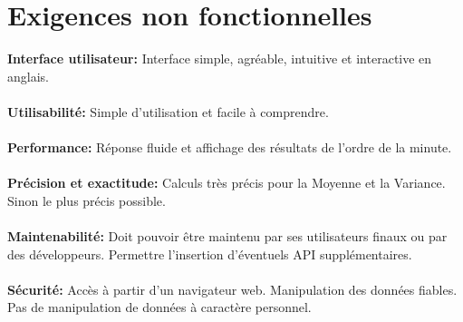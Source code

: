 	\section{Exigences non fonctionnelles}
	\begin{frame}
		\textbf{Interface utilisateur:} Interface simple, agréable, intuitive et interactive en anglais.\\~\\ 
		\pause
		\textbf{Utilisabilité:} Simple d'utilisation et facile à comprendre.\\~\\
		\pause
		\textbf{Performance:} Réponse fluide et affichage des résultats de l'ordre de la minute.\\~\\
		\pause
		\textbf{Précision et exactitude:} Calculs très précis pour la Moyenne et la Variance. Sinon le plus précis possible.\\~\\
		\pause
		\textbf{Maintenabilité:} Doit pouvoir être maintenu par ses utilisateurs finaux ou par des développeurs. Permettre l'insertion d'éventuels API supplémentaires.\\~\\
		\pause
		\textbf{Sécurité:} Accès à partir d'un navigateur web. Manipulation des données fiables. Pas de manipulation de données à caractère personnel.\\
	\end{frame}
	
